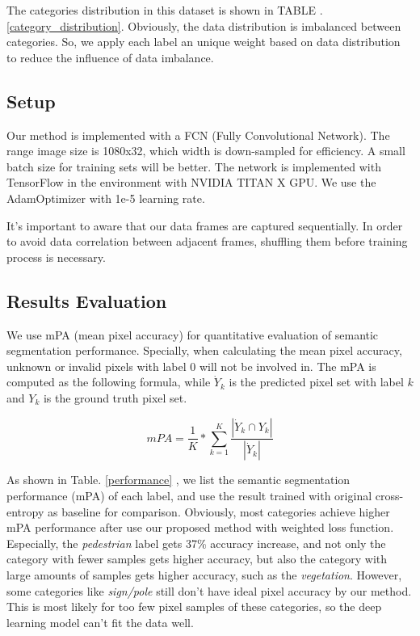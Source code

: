 The categories distribution in this dataset is shown in TABLE . \ref{category_distribution}. Obviously, the data distribution is imbalanced between categories. So, we apply each label an unique weight based on data distribution to reduce the influence of data imbalance.

\subsection{Setup}
Our method is implemented with a FCN (Fully Convolutional Network). The range image size is 1080x32, which width is down-sampled for efficiency. A small batch size for training sets will be better. The network is implemented with TensorFlow in the environment with NVIDIA TITAN X GPU. We use the AdamOptimizer with 1e-5 learning rate.

It's important to aware that our data frames are captured sequentially. In order to avoid data correlation between adjacent frames, shuffling them before training process is necessary.

\subsection{Results Evaluation}
We use mPA (mean pixel accuracy) for quantitative evaluation of semantic segmentation performance. Specially, when calculating the mean pixel accuracy, unknown or invalid pixels with label 0 will not be involved in. The mPA is computed as the following formula, while $\dot{Y}_k$ is the predicted pixel set with label $k$ and $Y_k$ is the ground truth pixel set.

\begin{equation}
mPA = \dfrac{1}{K}*\sum_{k=1}^{K}\dfrac{\left| \dot{Y}_k \cap Y_k \right|}{\left| \dot{Y}_k\right|}
\end{equation}

As shown in Table. \ref{performance} , we list the semantic segmentation performance (mPA) of each label, and use the result trained with original cross-entropy as baseline for comparison. Obviously, most categories achieve higher mPA performance after use our proposed method with weighted loss function. Especially, the \textit{pedestrian} label gets 37\% accuracy increase, and not only the category with fewer samples gets higher accuracy, but also the category with large amounts of samples gets higher accuracy, such as the \textit{vegetation}. However, some categories like \textit{sign/pole} still don't have ideal pixel accuracy by our method. This is most likely for too few pixel samples of these categories, so the deep learning model can't fit the data well.

